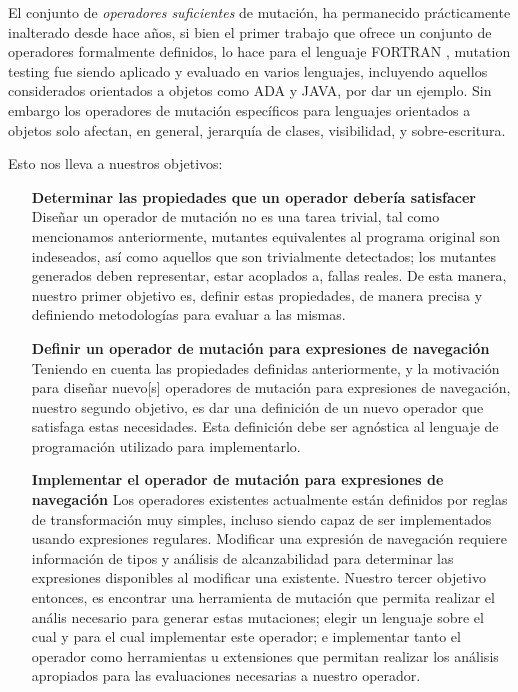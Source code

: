El conjunto de \emph{operadores suficientes} de mutaci\'on, ha permanecido pr\'acticamente inalterado desde hace a\~nos, si bien el primer trabajo que ofrece un conjunto de operadores formalmente definidos, lo hace para el lenguaje FORTRAN \cite{bibliography.mutation.definitions.fortranOffut87, bibliography.mutation.definitions.fortranKing91}, mutation testing fue siendo aplicado y evaluado en varios lenguajes, incluyendo aquellos considerados orientados a objetos como ADA y JAVA, por dar un ejemplo. Sin embargo los operadores de mutaci\'on espec\'ificos para lenguajes orientados a objetos solo afectan, en general, jerarqu\'ia de clases, visibilidad, y sobre-escritura. 

Esto nos lleva a nuestros objetivos:

\begin{enumerate}[leftmargin=.75cm,align=left,style=nextline]
	\item[\textbf{Determinar las propiedades que un operador deber\'ia satisfacer}]\mbox{}\\ Dise\~nar un operador de mutaci\'on no es una tarea trivial, tal como mencionamos anteriormente, mutantes equivalentes al programa original son indeseados, as\'i como aquellos que son trivialmente detectados; los mutantes generados deben representar, estar acoplados a, fallas reales. De esta manera, nuestro primer objetivo es, definir estas propiedades, de manera precisa y definiendo metodolog\'ias para evaluar a las mismas.
	
	\item[\textbf{Definir un operador de mutaci\'on para expresiones de navegaci\'on}]\mbox{}\\
	Teniendo en cuenta las propiedades definidas anteriormente, y la motivaci\'on para dise\~nar nuevo[s] operadores de mutaci\'on para expresiones de navegaci\'on, nuestro segundo objetivo, es dar una definici\'on de un nuevo operador que satisfaga estas necesidades. Esta definici\'on debe ser agn\'ostica al lenguaje de programaci\'on utilizado para implementarlo.
	
	\item[\textbf{Implementar el operador de mutaci\'on para expresiones de navegaci\'on}] Los operadores existentes actualmente est\'an definidos por reglas de transformaci\'on muy simples, incluso siendo capaz de ser implementados usando expresiones regulares. Modificar una expresi\'on de navegaci\'on requiere informaci\'on de tipos y an\'alisis de alcanzabilidad para determinar las expresiones disponibles al modificar una existente. Nuestro tercer objetivo entonces, es encontrar una herramienta de mutaci\'on que permita realizar el an\'alis necesario para generar estas mutaciones; elegir un lenguaje sobre el cual y para el cual implementar este operador; e implementar tanto el operador como herramientas u extensiones que permitan realizar los an\'alisis apropiados para las evaluaciones necesarias a nuestro operador.
	

\end{enumerate}
